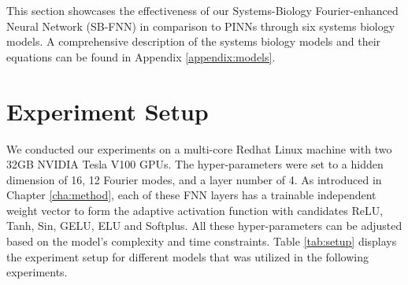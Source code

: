 
This section showcases the effectiveness of our Systems-Biology Fourier-enhanced Neural Network (SB-FNN) in comparison to PINNs through six systems biology models. A comprehensive description of the systems biology models and their equations can be found in Appendix \ref{appendix:models}.


\section{Experiment Setup}




We conducted our experiments on a multi-core Redhat Linux machine with two 32GB NVIDIA Tesla V100 GPUs. The hyper-parameters were set to a hidden dimension of 16, 12 Fourier modes, and a layer number of 4. As introduced in Chapter \ref{cha:method}, each of these FNN layers has a trainable independent weight vector to form the adaptive activation function with candidates ReLU, Tanh, Sin, GELU, ELU and Softplus. All these hyper-parameters can be adjusted based on the model's complexity and time constraints. Table \ref{tab:setup} displays the experiment setup for different models that was utilized in the following experiments.

